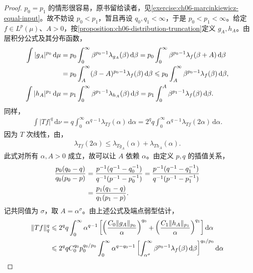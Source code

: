 \documentclass[../../main.tex]{subfiles}
\begin{document}
\begin{proof}
$p_0=p_1$ 的情形很容易，原书留给读者，见\cref{exercise:ch06-marcinkiewicz-equal-input}。故不妨设 $p_0<p_1$，暂且再设 $q_0,q_1<\infty$，于是 $p_0<p_1<\infty$。给定 $f\in L^p(\mu)$、$A>0$，按\cref{proposition:ch06-distribution-truncation}定义 $g_A,h_A$。由层积分公式及其分布函数，
\begin{align}
\int|g_A|^{p_0}\,\mathrm d\mu
&=p_0\int_0^\infty\beta^{p_0-1}\lambda_{g_A}(\beta)\,\mathrm d\beta
=p_0\int_0^\infty\beta^{p_0-1}\lambda_f(\beta+A)\,\mathrm d\beta\notag\\
&=p_0\int_A^\infty(\beta-A)^{p_0-1}\lambda_f(\beta)\,\mathrm d\beta
\leqslant p_0\int_A^\infty\beta^{p_0-1}\lambda_f(\beta)\,\mathrm d\beta,\notag\\
\int|h_A|^{p_1}\,\mathrm d\mu
&=p_1\int_0^\infty\beta^{p_1-1}\lambda_{h_A}(\beta)\,\mathrm d\beta
=p_1\int_0^A\beta^{p_1-1}\lambda_f(\beta)\,\mathrm d\beta.
\label{align:ch06-marcinkiewicz-input-truncations}
\end{align}
同样，
\begin{align}
\int|Tf|^q\,\mathrm d\nu
=q\int_0^\infty\alpha^{q-1}\lambda_{Tf}(\alpha)\,\mathrm d\alpha
=2^qq\int_0^\infty\alpha^{q-1}\lambda_{Tf}(2\alpha)\,\mathrm d\alpha.
\label{align:ch06-marcinkiewicz-output-layers}
\end{align}
因为 $T$ 次线性，由，
\begin{align}
\lambda_{Tf}(2\alpha)\leqslant\lambda_{Tg_A}(\alpha)+\lambda_{Th_A}(\alpha).
\label{align:ch06-marcinkiewicz-output-split}
\end{align}
此式对所有 $\alpha,A>0$ 成立，故可以让 $A$ 依赖 $\alpha$。由定义 $p,q$ 的插值关系，
\begin{align}
\frac{p_0(q_0-q)}{q_0(p_0-p)}
&=\frac{p^{-1}(q^{-1}-q_0^{-1})}{q^{-1}(p^{-1}-p_0^{-1})}
=\frac{p^{-1}(q^{-1}-q_1^{-1})}{q^{-1}(p^{-1}-p_1^{-1})}\notag\\
&=\frac{p_1(q_1-q)}{q_1(p_1-p)}.
\label{align:ch06-marcinkiewicz-sigma}
\end{align}
记共同值为 $\sigma$，取 $A=\alpha^\sigma$。由上述公式及端点弱型估计，
\begin{align}
\|Tf\|_q^q
&\leqslant2^qq\int_0^\infty\alpha^{q-1}
\left[\left(\frac{C_0\|g_A\|_{p_0}}\alpha\right)^{q_0}
+\left(\frac{C_1\|h_A\|_{p_1}}\alpha\right)^{q_1}\right]\mathrm d\alpha\notag\\
&\leqslant2^qqC_0^{q_0}p_0^{q_0/p_0}\int_0^\infty\alpha^{q-q_0-1}
\left[\int_{\alpha^\sigma}^\infty\beta^{p_0-1}\lambda_f(\beta)\,\mathrm d\beta\right]^{q_0/p_0}\mathrm d\alpha\notag\\

\end{align}
\end{proof}
\end{document}
